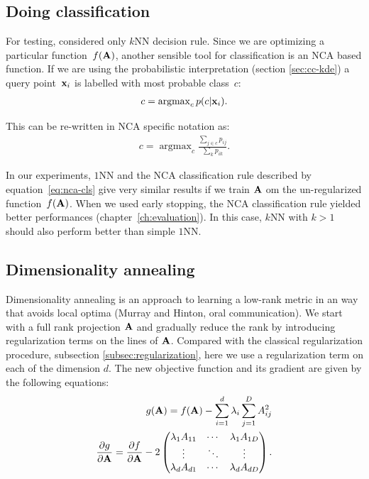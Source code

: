 \subsection{Doing classification}
\label{subsec:doing-classification}

  For testing, \citet{goldberger2004} considered only $k$NN decision rule. Since we are optimizing a particular function~$f(\mathbf{A})$, another sensible tool for classification is an NCA based function. If we are using the probabilistic interpretation (section \ref{sec:cc-kde}) a query point~$\mathbf{x}_i$ is labelled with most probable class~$c$:
  \begin{align}
     c = \operatorname{argmax}_cp(c|\mathbf{x}_i).
  \end{align}

  This can be re-written in NCA specific notation as:
  \begin{align}
    c = \operatorname{argmax}_c\frac{\sum_{j\in c}p_{ij}}{\sum_k p_{ik}}.
    \label{eq:nca-cls}
  \end{align}

  In our experiments, $1$NN and the NCA classification rule described by equation~\eqref{eq:nca-cls} give very similar results if we train $\mathbf{A}$ om the un-regularized function~$f(\mathbf{A})$. When we used early stopping, the NCA classification rule yielded better performances (chapter~\ref{ch:evaluation}). In this case, $k$NN with $k>1$ should also perform better than simple $1$NN.

\subsection{Dimensionality annealing}
\label{subsec:dimensionality-annealing}

  Dimensionality annealing is an approach to learning a low-rank metric in an way that avoids local optima (Murray and Hinton, oral communication). We start with a full rank projection $\mathbf{A}$ and gradually reduce the rank by introducing regularization terms on the lines of $\mathbf{A}$. Compared with the classical regularization procedure, subsection \ref{subsec:regularization}, here we use a regularization term on each of the dimension $d$. The new objective function and its gradient are given by the following equations:
    \begin{align}
            g(\mathbf{A}) = f(\mathbf{A}) - \sum_{i=1}^d\lambda_i\sum_{j=1}^D A_{ij}^2\\
            \frac{\partial g}{\partial \mathbf{A}} = \frac{\partial f}{\partial \mathbf{A}} - 2\begin{pmatrix}
                              \lambda_1A_{11} &  \cdots & \lambda_1A_{1D} \\
                              \vdots  &   \ddots & \vdots  \\
                              \lambda_dA_{d1} & \cdots & \lambda_dA_{dD}
                             \end{pmatrix}.
     \end{align}


